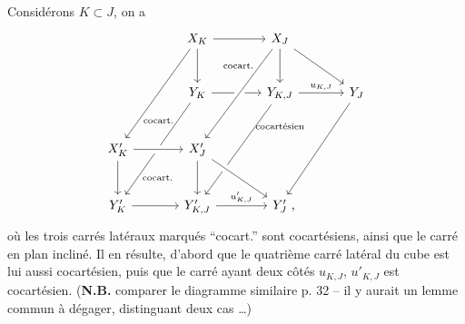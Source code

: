 Considérons $K \subset J$, on a
\[
\begin{tikzcd}[row sep=large, column sep=large]
& X_K \arrow[r] \arrow[d] \arrow[ddl] \arrow[dr, phantom, "\text{\scriptsize cocart.}"] & X_J \arrow[d] \arrow[dr] & \\
& Y_K \arrow[r] \arrow[ddl] \arrow[dl, phantom, "\text{\scriptsize cocart.}"] & Y_{K,J} \arrow[r, "u_{K,J}"] \arrow[ddl] \arrow[d, phantom, "\text{\scriptsize cocartésien}"] & Y_J \arrow[ddl] \\
X'_K \arrow[r, crossing over] \arrow[d] \arrow[dr, phantom, "\text{\scriptsize cocart.}"] & X'_J \arrow[d] \arrow[dr, crossing over] \arrow[from=1-3, crossing over] & {} & \\
Y'_K \arrow[r] & Y'_{K,J} \arrow[r, "u'_{K,J}"] & Y'_J \rlap{\ ,} &
\end{tikzcd}
\]
où les trois carrés latéraux marqués “cocart.” sont cocartésiens, ainsi que le carré en plan incliné. Il en résulte, d'abord que le quatrième carré latéral du cube est lui aussi cocartésien,  puis que le carré ayant deux côtés $u_{K,J}$, $u'_{K,J}$ est cocartésien. (\textbf{N.B.} comparer le diagramme similaire p. 32 -- il y aurait un lemme commun à dégager, distinguant deux cas \ldots)

